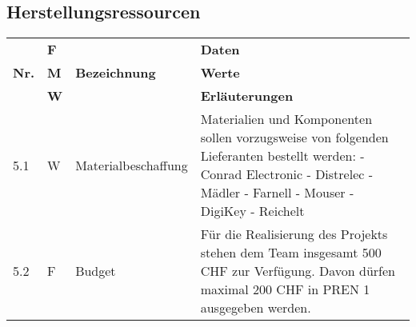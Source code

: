 \documentclass[main.tex]{subfiles} %
\begin{document}
\subsection*{Herstellungsressourcen}
\begin{tabular}{|l|p{0.5cm}|p{4cm}|p{10cm}|}
  \hline
               & \textbf{F} &                                  & \textbf{Daten}                                                                                                                                                                                                                                                                                                                                                                                \\
  \textbf{Nr.} & \textbf{M} & \textbf{Bezeichnung}             & \textbf{Werte}                                                                                                                                                                                                                                                                                                                                                                                \\
               & \textbf{W} &                                  & \textbf{Erläuterungen}                                                                                                                                                                                                                                                                                                                                                                        \\
  \hline
  5.1          & W          & Materialbeschaffung              & Materialien und Komponenten sollen vorzugsweise von folgenden Lieferanten bestellt werden: \newline - Conrad Electronic \newline - Distrelec \newline - Mädler \newline - Farnell \newline - Mouser \newline - DigiKey \newline - Reichelt                                                                                                                                                    \\
  \hline
  5.2          & F          & Budget                           & Für die Realisierung des Projekts stehen dem Team insgesamt 500 CHF zur Verfügung. Davon dürfen maximal 200 CHF in PREN 1 ausgegeben werden.                                                                                                                                                                                                                                                  \\

\end{tabular}
\end{document}
